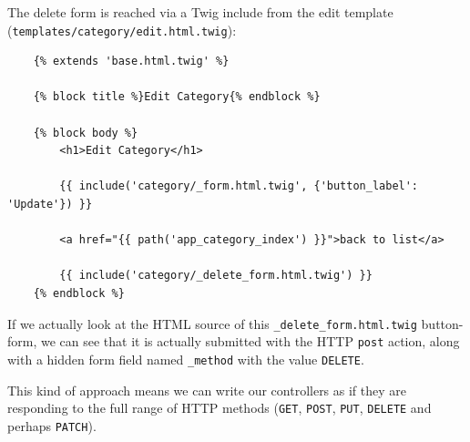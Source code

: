 \documentclass[a4paperpaper,openright]{book}
\newenvironment{Shaded}{}{}
\newcommand{\CommentTok}[1]{\textcolor[rgb]{0.38,0.63,0.69}{\textit{#1}}}
\newcommand{\KeywordTok}[1]{\textcolor[rgb]{0.00,0.44,0.13}{\textbf{#1}}}
\newcommand{\NormalTok}[1]{#1}
\newcommand{\OtherTok}[1]{\textcolor[rgb]{0.00,0.44,0.13}{#1}}
\newcommand{\StringTok}[1]{\textcolor[rgb]{0.25,0.44,0.63}{#1}}
\begin{document}
\begin{Shaded}
\end{Shaded}

The delete form is reached via a Twig include from the edit template
(\texttt{templates/category/edit.html.twig}):

\begin{verbatim}
    {% extends 'base.html.twig' %}

    {% block title %}Edit Category{% endblock %}

    {% block body %}
        <h1>Edit Category</h1>

        {{ include('category/_form.html.twig', {'button_label': 'Update'}) }}

        <a href="{{ path('app_category_index') }}">back to list</a>

        {{ include('category/_delete_form.html.twig') }}
    {% endblock %}
\end{verbatim}

If we actually look at the HTML source of this
\texttt{\_delete\_form.html.twig} button-form, we can see that it is
actually submitted with the HTTP \texttt{post} action, along with a
hidden form field named \texttt{\_method} with the value
\texttt{DELETE}.

This kind of approach means we can write our controllers as if they are
responding to the full range of HTTP methods (\texttt{GET},
\texttt{POST}, \texttt{PUT}, \texttt{DELETE} and perhaps
\texttt{PATCH}).
\end{document}
